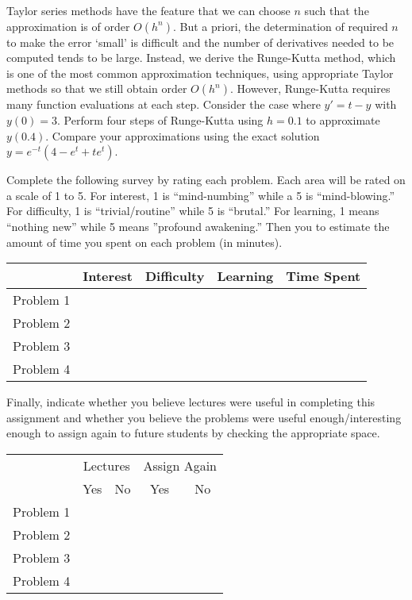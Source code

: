 \documentclass[11pt,letterpaper]{article}
\begin{document}
\newpage



 Taylor series methods have the feature that we can choose $n$ such that the approximation is of order $O(h^n)$. But a priori, the determination of required $n$ to make the error `small' is difficult and the number of derivatives needed to be computed tends to be large. Instead, we derive the Runge-Kutta method, which is one of the most common approximation techniques, using appropriate Taylor methods so that we still obtain order $O(h^n)$. However, Runge-Kutta requires many function evaluations at each step. Consider the case where $y'= t - y$ with $y(0)= 3$. Perform four steps of Runge-Kutta using $h= 0.1$ to approximate $y(0.4)$. Compare your approximations using the exact solution $y= e^{-t} (4 - e^t + t e^t)$. 



\newpage



 \pvspace{0.3cm}

Complete the following survey by rating each problem. Each area will be rated on a scale of 1 to 5. For interest, 1 is ``mind-numbing'' while a 5 is ``mind-blowing.'' For difficulty, 1 is ``trivial/routine'' while 5 is ``brutal.'' For learning, 1 means ``nothing new'' while 5 means ''profound awakening.'' Then you to estimate the amount of time you spent on each problem (in minutes). 

\vspace{0.25cm}
\begin{center}
\begin{tabular}{c||c|c|c|c|}
 & Interest & Difficulty & Learning & Time Spent \\ \hline \hline
Problem 1 &  &  &  &  \\ \hline
Problem 2 &  &  &  &  \\ \hline
Problem 3 &  &  &  &  \\ \hline
Problem 4 &  &  &  & 
\end{tabular}
\end{center}
\vspace{0.25cm}

Finally, indicate whether you believe lectures were useful in completing this assignment and whether you believe the problems were useful enough/interesting enough to assign again to future students by checking the appropriate space.

\vspace{0.25cm}
\begin{center}
\begin{tabular}{c||c|c|c|c|}
  & \multicolumn{2}{c|}{Lectures} &  \multicolumn{2}{c|}{Assign Again} \\ \cline{2-5}
   & Yes & No & Yes & No \\ \hline \hline
  Problem 1 &  &  &  &  \\ \hline 
  Problem 2 &  &  &  &  \\ \hline 
  Problem 3 &  &  &  &  \\ \hline 
  Problem 4 &  &  &  &  
\end{tabular}
\end{center}
\end{document}
